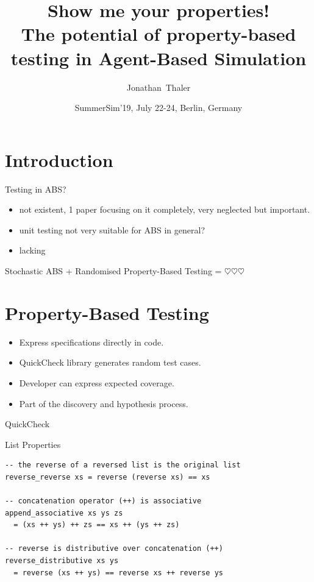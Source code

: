 \documentclass{beamer} %
\title[Show me your properties! The potential of property-based testing in Agent-Based Simulation] 
{%
  Show me your properties! \\ The potential of property-based testing in Agent-Based Simulation
}
\author[Thaler]
{
  Jonathan~Thaler
}
\institute[University of Nottingham, Nottingham, United Kingdom]
{
  University of Nottingham, Nottingham, United Kingdom
}
\date[SummerSim'19, July 22-24, Berlin, Germany]
{SummerSim'19, July 22-24, Berlin, Germany}
\begin{document}
\begin{frame}
  \titlepage
\end{frame}

\section{Introduction}
\begin{frame}{Testing in ABS?}
\begin{itemize}
	\item not existent, 1 paper focusing on it completely, very neglected but important. 
  	\item unit testing not very suitable for ABS in general?
  	\item lacking 
\end{itemize}

\begin{block}{}
Stochastic ABS + Randomised Property-Based Testing = $\heartsuit \heartsuit \heartsuit$
\end{block}
\end{frame}

\section{Property-Based Testing}
\begin{frame}{}
  \begin{itemize}
    \item Express specifications directly in code.
    \item QuickCheck library generates random test cases.
    \item Developer can express expected coverage.
    \item Part of the discovery and hypothesis process.
  \end{itemize}
\end{frame}

\begin{frame}[fragile]{QuickCheck}
\begin{block}{List Properties}
\begin{verbatim}
-- the reverse of a reversed list is the original list
reverse_reverse xs = reverse (reverse xs) == xs

-- concatenation operator (++) is associative
append_associative xs ys zs 
  = (xs ++ ys) ++ zs == xs ++ (ys ++ zs)

-- reverse is distributive over concatenation (++)
reverse_distributive xs ys 
  = reverse (xs ++ ys) == reverse xs ++ reverse ys
\end{verbatim}
\end{block}
\end{frame}
\end{document}
